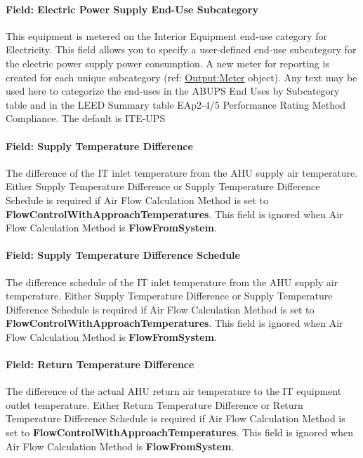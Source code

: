 \paragraph{Field: Electric Power Supply End-Use Subcategory}\label{field-electric-power-supply-end-use-subcategory}

This equipment is metered on the Interior Equipment end-use category for Electricity. This field allows you to specify a user-defined end-use subcategory for the electric power supply power consumption. A new meter for reporting is created for each unique subcategory (ref: \hyperref[outputmeter-and-outputmetermeterfileonly]{Output:Meter} object). Any text may be used here to categorize the end-uses in the ABUPS End Uses by Subcategory table and in the LEED Summary table EAp2-4/5 Performance Rating Method Compliance. The default is ITE-UPS

\paragraph{Field: Supply Temperature Difference}\label{field-supply-temperature-difference}

The difference of the IT inlet temperature from the AHU supply air temperature. Either Supply Temperature Difference or Supply Temperature Difference Schedule is required if Air Flow Calculation Method is set to \textbf{FlowControlWithApproachTemperatures}. This field is ignored when Air Flow Calculation Method is \textbf{FlowFromSystem}.

\paragraph{Field: Supply Temperature Difference Schedule}\label{field-supply-temperature-difference-schedule}

The difference schedule of the IT inlet temperature from the AHU supply air temperature. Either Supply Temperature Difference or Supply Temperature Difference Schedule is required if Air Flow Calculation Method is set to \textbf{FlowControlWithApproachTemperatures}. This field is ignored when Air Flow Calculation Method is \textbf{FlowFromSystem}.

\paragraph{Field: Return Temperature Difference}\label{field-return-temperature-difference}

The difference of the actual AHU return air temperature to the IT equipment outlet temperature. Either Return Temperature Difference or Return Temperature Difference Schedule is required if Air Flow Calculation Method is set to \textbf{FlowControlWithApproachTemperatures}. This field is ignored when Air Flow Calculation Method is \textbf{FlowFromSystem}.

